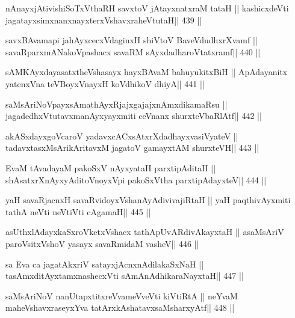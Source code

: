 \begin{shl}
nAnayxjAtivishiSoTxV\s thaRH savxtoV jAtayxnatxraM tataH ||
kashicxdeVti jagatayxsimxnanxnayxterxVshavxraheVtutaH\hfill || 439 ||
\end{shl}

\begin{shl}
savxBAvamapi {ja}hAyxcecxVdaginxH shiVtoV BaveVdudhxrXvamf ||
savaRparxmANakoVpashacx savaRM sAyxdadharoVtatxramf\hfill || 440 ||
\end{shl}

\begin{shl}
sAMKAyxdayasatxtheVshasayx hayxBAvaM bahuyukitxBiH ||
ApAdayanitx yatenxVna teVBoyxV\s nayxH koV\s dhikoV dhiyA\hfill || 441 ||
\end{shl}

\begin{shl}
saMsAriNoV\s payxsAmathAyxRjajxgajajxnAmxdikamaRsu ||
jagadedhxVtutavxmanAyxyayxmiti ceVnanx shurxteVbaRlAtf\hfill || 442 ||
\end{shl}

\begin{shl}
akASxdayxgoVcaroV yadavxcACxsAtxrXdadhayxvasiVyateV ||
tadavxtasxMsArikAritavxM jagatoV gamayxtAM shurxteVH\hfill || 443 ||
\end{shl}

\begin{shl}
EvaM tAvadayaM pakoSxV nAyxyataH parxtipAditaH ||
shAsatxrXnAyxyAditoV\s noyxV\s pi pakoSxV\s tha parxtipAdayxteV\hfill || 444 ||
\end{shl}

\begin{shl}
yaH savaRjacnxH savaRvidoyxV\s shanAyAdivivajiRtaH ||
yaH paqthivAyxmiti tathA neVti neVtiVti cA\s\s gamaH\hfill || 445 ||
\end{shl}

\begin{shl}
asUthxlAdayxkaSxroVketxVshacx tathA\s pUvARdivAkayxtaH ||
asaMsAriV paroV\s sitxVshoV yasayx savaRmidaM vasheV\hfill || 446 ||
\end{shl}

\begin{shl}
sa Eva ca jagatAkxriV satayxjAcnxnAdilakaSxNaH ||
tasAmxditAyxtamxnashecxVti sAmAnAdhikaraNayxtaH\hfill || 447 ||
\end{shl}

\begin{shl}
saMsAriNoV nanUtapxtitxreVvameVveVti kiVtiRtA ||
neYvaM maheVshavxraseyxYva tatArx\s\s kAshatavxsaMsharxyAtf\hfill || 448 ||
\end{shl}

